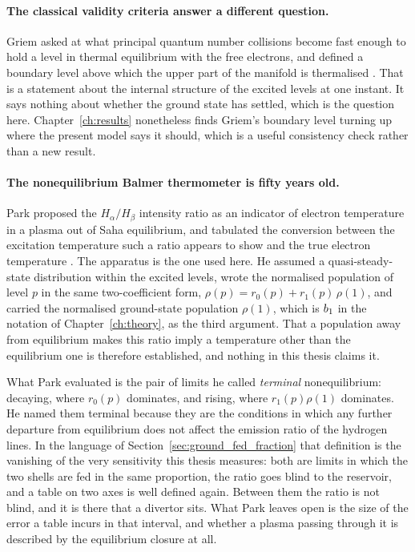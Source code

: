 \paragraph{The classical validity criteria answer a different question.} Griem
asked at what principal quantum number collisions become fast enough to hold a
level in thermal equilibrium with the free electrons, and defined a boundary
level above which the upper part of the manifold is thermalised
\cite{Griem1963, Griem1997}. That is a statement about the internal structure of
the excited levels at one instant. It says nothing about whether the ground state
has settled, which is the question here. Chapter~\ref{ch:results} nonetheless
finds Griem's boundary level turning up where the present model says it should,
which is a useful consistency check rather than a new result.

\paragraph{The nonequilibrium Balmer thermometer is fifty years old.} Park
proposed the $H_\alpha/H_\beta$ intensity ratio as an indicator of electron
temperature in a plasma out of Saha equilibrium, and tabulated the conversion
between the excitation temperature such a ratio appears to show and the true
electron temperature \cite{Park1972}. The apparatus is the one used here. He
assumed a quasi-steady-state distribution within the excited levels, wrote the
normalised population of level $p$ in the same two-coefficient form,
$\rho(p) = r_0(p) + r_1(p)\,\rho(1)$, and carried the normalised ground-state
population $\rho(1)$, which is $b_1$ in the notation of
Chapter~\ref{ch:theory}, as the third argument. That a population away from
equilibrium makes this ratio imply a temperature other than the equilibrium one
is therefore established, and nothing in this thesis claims it.

What Park evaluated is the pair of limits he called \emph{terminal}
nonequilibrium: decaying, where $r_0(p)$ dominates, and rising, where
$r_1(p)\rho(1)$ dominates. He named them terminal because they are the
conditions in which any further departure from equilibrium does not affect the
emission ratio of the hydrogen lines. In the language of
Section~\ref{sec:ground_fed_fraction} that definition is the vanishing of the very
sensitivity this thesis measures: both are limits in which the two shells are
fed in the same proportion, the ratio goes blind to the reservoir, and a table
on two axes is well defined again. Between them the ratio is not blind, and it
is there that a divertor sits. What Park leaves open is the size of the error a
table incurs in that interval, and whether a plasma passing through it is
described by the equilibrium closure at all.

